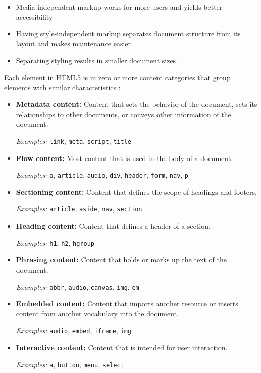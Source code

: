 \begin{itemize}
\item Media-independent markup works for more users and yields better
  accessibility
\item Having style-independent markup separates document structure
  from its layout and makes maintenance easier
\item Separating styling results in smaller document sizes.
\end{itemize}

\noindent Each element in HTML5 is in zero or more content categories
that group elements with similar characteristics \cite{HTML5draft}:

\begin{itemize}
\item \textbf{Metadata content:} Content that sets the behavior of the
  document, sets its relationships to other documents, or conveys
  other information of the document.

  \textit{Examples:} \texttt{link}, \texttt{meta}, \texttt{script},
  \texttt{title}

\item \textbf{Flow content:} Most content that is used in the body of
  a document.

  \textit{Examples:} \texttt{a}, \texttt{article}, \texttt{audio},
  \texttt{div}, \texttt{header}, \texttt{form}, \texttt{nav},
  \texttt{p}

\item \textbf{Sectioning content:} Content that defines the scope of
  headings and footers.

  \textit{Examples:} \texttt{article}, \texttt{aside}, \texttt{nav},
  \texttt{section}

\item \textbf{Heading content:} Content that defines a header of a
  section.

  \textit{Examples:} \texttt{h1}, \texttt{h2}, \texttt{hgroup}

\item \textbf{Phrasing content:} Content that holds or marks up the
  text of the document.

  \textit{Examples:} \texttt{abbr}, \texttt{audio}, \texttt{canvas},
  \texttt{img}, \texttt{em}

\item \textbf{Embedded content:} Content that imports another resource
  or inserts content from another vocabulary into the document.

  \textit{Examples:} \texttt{audio}, \texttt{embed}, \texttt{iframe},
  \texttt{img}

\item \textbf{Interactive content:} Content that is intended for user
  interaction.

  \textit{Examples:} \texttt{a}, \texttt{button}, \texttt{menu},
  \texttt{select}

\end{itemize}

